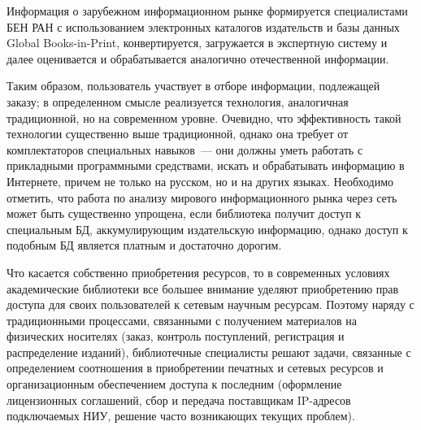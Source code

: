 \begin{multicols}{2}
   Информация о зарубежном информационном рынке формируется специалистами БЕН 
РАН с использованием электронных каталогов издательств и базы данных Global 
Books-in-Print, конвертируется, загружается в экспертную систему и далее оценивается и 
обрабатывается аналогично отечественной информации. 
   
   Таким образом, пользователь участвует в отборе информации, подлежащей заказу; в 
определенном смысле реализуется технология, аналогичная традиционной, но на 
современном уровне. Очевидно, что эффективность такой технологии существенно выше 
традиционной, однако она требует от комплектаторов специальных навыков~--- они 
должны уметь работать с прикладными программными средствами, искать и 
обрабатывать информацию в Интернете, причем не только на русском, но и на других 
языках. Необходимо отметить, что работа по анализу мирового информационного рынка 
через сеть может быть существенно упрощена, если библиотека получит доступ к 
специальным БД, аккумулирующим издательскую информацию, однако доступ 
к подобным БД является платным и достаточно дорогим. 
   
   Что касается собственно приобретения ресурсов, то в современных условиях 
академические библиотеки все большее внимание уделяют приобретению прав доступа 
для своих пользователей к сетевым научным ресурсам. Поэтому наряду с традиционными 
процессами, связанными с получением материалов на физических носителях (заказ, 
контроль поступлений, регистрация и распределение изданий), библиотечные 
специалисты решают задачи, связанные с определением соотношения в приобретении 
печатных и сетевых ресурсов и организационным обеспечением доступа к последним 
(оформление лицензионных соглашений, сбор и передача поставщикам IP-ад\-ре\-сов 
подключаемых НИУ, решение часто возникающих текущих проб\-лем). 
   

\end{multicols}

